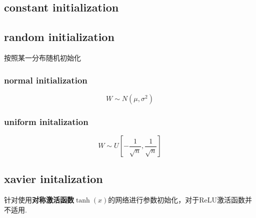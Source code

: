 \subsection{constant initialization}

\subsection{random initialization}
按照某一分布随机初始化
\subsubsection{normal initialization}
\begin{equation}
    W \sim N(\mu, \sigma^2)
\end{equation}

\subsubsection{uniform initalization}
\begin{equation}
    W \sim U[-\frac{1}{\sqrt{n}}, \frac{1}{\sqrt{n}}]
\end{equation}

\subsection{xavier initalization}
针对使用\textbf{对称激活函数}$\tanh(x)$的网络进行参数初始化，对于ReLU激活函数并不适用\cite{Glorot2010}.

